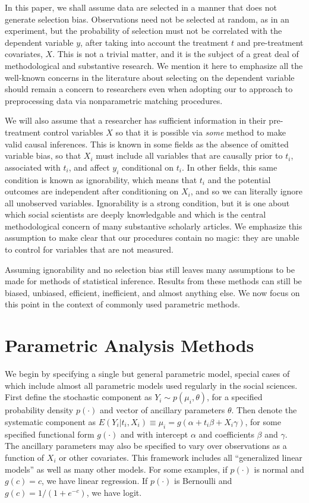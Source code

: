\documentclass[11pt,titlepage]{article}
\begin{document}
In this paper, we shall assume data are selected in a manner that does
not generate selection bias.  Observations need not be selected at
random, as in an experiment, but the probability of selection must not
be correlated with the dependent variable $y$, after taking into
account the treatment $t$ and pre-treatment covariates, $X$.  This is
not a trivial matter, and it is the subject of a great deal of
methodological and substantive research.  We mention it here to
emphasize all the well-known concerns in the literature about
selecting on the dependent variable should remain a concern to
researchers even when adopting our to approach to preprocessing data
via nonparametric matching procedures.

We will also assume that a researcher has sufficient information in
their pre-treatment control variables $X$ so that it is possible via
\emph{some} method to make valid causal inferences.  This is known in
some fields as the absence of omitted variable bias, so that $X_i$
must include all variables that are causally prior to $t_i$,
associated with $t_i$, and affect $y_i$ conditional on $t_i$.  In
other fields, this same condition is known as ignorability, which
means that $t_i$ and the potential outcomes are independent after
conditioning on $X_i$, and so we can literally ignore all unobserved
variables.  Ignorability is a strong condition, but it is one about
which social scientists are deeply knowledgable and which is the
central methodological concern of many substantive scholarly articles.
We emphasize this assumption to make clear that our procedures contain
no magic: they are unable to control for variables that are not
measured.

Assuming ignorability and no selection bias still leaves many
assumptions to be made for methods of statistical inference.  Results
from these methods can still be biased, unbiased, efficient,
inefficient, and almost anything else.  We now focus on this point in
the context of commonly used parametric methods.

\section{Parametric Analysis Methods}

We begin by specifying a single but general parametric model, special
cases of which include almost all parametric models used regularly in
the social sciences.  First define the stochastic component as $Y_i
\sim p(\mu_i,\theta)$, for a specified probability density $p(\cdot)$
and vector of ancillary parameters $\theta$.  Then denote the
systematic component as $E(Y_i|t_i,X_i)\equiv\mu_i=g(\alpha + t_i\beta
+ X_i\gamma)$, for some specified functional form $g(\cdot)$ and with
intercept $\alpha$ and coefficients $\beta$ and $\gamma$.  The
ancillary parameters may also be specified to vary over observations
as a function of $X_i$ or other covariates.  This framework includes
all ``generalized linear models'' as well as many other models.  For
some examples, if $p(\cdot)$ is normal and $g(c)=c$, we have linear
regression.  If $p(\cdot)$ is Bernoulli and $g(c)=1/(1+e^{-c})$, we
have logit.
\end{document}
